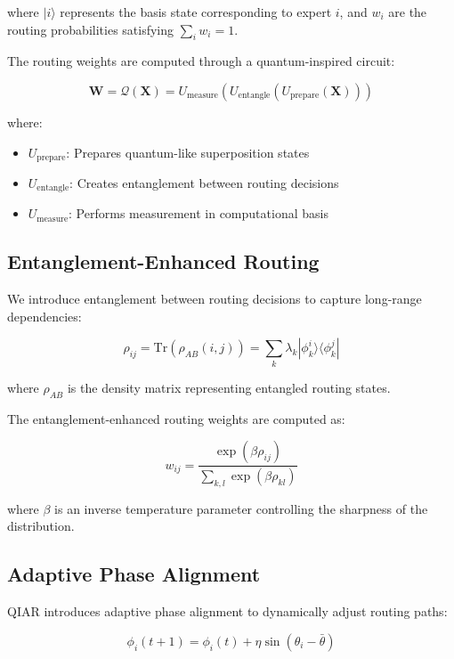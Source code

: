 \documentclass[10pt,journal,compsoc]{IEEEtran}
\begin{document}
where $|i\rangle$ represents the basis state corresponding to expert $i$, and $w_i$ are the routing probabilities satisfying $\sum_i w_i = 1$.

The routing weights are computed through a quantum-inspired circuit:

\begin{equation}
    \mathbf{W} = \mathcal{Q}(\mathbf{X}) = U_{\text{measure}}(U_{\text{entangle}}(U_{\text{prepare}}(\mathbf{X})))
\end{equation}

where:
\begin{itemize}
    \item $U_{\text{prepare}}$: Prepares quantum-like superposition states
    \item $U_{\text{entangle}}$: Creates entanglement between routing decisions
    \item $U_{\text{measure}}$: Performs measurement in computational basis
\end{itemize}

\subsection{Entanglement-Enhanced Routing}
We introduce entanglement between routing decisions to capture long-range dependencies:

\begin{equation}
    \rho_{ij} = \text{Tr}(\rho_{AB}(i,j)) = \sum_k \lambda_k |\phi_k^i\rangle\langle\phi_k^j|
\end{equation}

where $\rho_{AB}$ is the density matrix representing entangled routing states.

The entanglement-enhanced routing weights are computed as:

\begin{equation}
    w_{ij} = \frac{\exp(\beta \rho_{ij})}{\sum_{k,l} \exp(\beta \rho_{kl})}
\end{equation}

where $\beta$ is an inverse temperature parameter controlling the sharpness of the distribution.

\subsection{Adaptive Phase Alignment}
QIAR introduces adaptive phase alignment to dynamically adjust routing paths:

\begin{equation}
    \phi_i(t+1) = \phi_i(t) + \eta \sin(\theta_i - \bar{\theta})
\end{equation}
\end{document}
